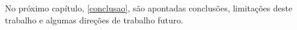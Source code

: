 No próximo capítulo, \ref{conclusao}, são apontadas conclusões, limitações deste trabalho e algumas direções de trabalho futuro.

